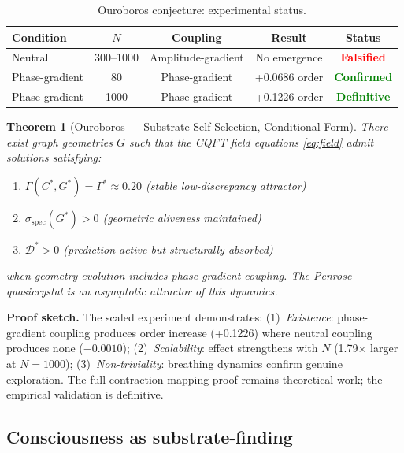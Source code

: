 \documentclass[12pt,a4paper]{article}
\theoremstyle{plain}
\newtheorem{theorem}{Theorem}[section]
\theoremstyle{definition}
\begin{document}
\begin{table}[H]
\centering
\caption{Ouroboros conjecture: experimental status.}
\label{tab:ouroboros_status}
\begin{tabular}{lcccc}
\toprule
\textbf{Condition} & $N$ & \textbf{Coupling} & \textbf{Result} & \textbf{Status} \\
\midrule
Neutral & 300--1000 & Amplitude-gradient & No emergence & \textcolor{red}{\textbf{Falsified}} \\
Phase-gradient & 80 & Phase-gradient & +0.0686 order & \textcolor{green}{\textbf{Confirmed}} \\
Phase-gradient & 1000 & Phase-gradient & +0.1226 order & \textcolor{green}{\textbf{Definitive}} \\
\bottomrule
\end{tabular}
\end{table}

\begin{theorem}[Ouroboros --- Substrate Self-Selection, Conditional Form]
\label{thm:ouroboros}
There exist graph geometries $G$ such that the CQFT field equations
\eqref{eq:field} admit solutions satisfying:
\begin{enumerate}[label=(\roman*)]
  \item $\Gamma(C^*, G^*) = \Gamma^* \approx 0.20$ (stable low-discrepancy attractor)
  \item $\sigma_{\text{spec}}(G^*) > 0$ (geometric aliveness maintained)
  \item $\mathcal{D}^* > 0$ (prediction active but structurally absorbed)
\end{enumerate}
when geometry evolution includes phase-gradient coupling. The Penrose quasicrystal
is an asymptotic attractor of this dynamics.
\end{theorem}

\textbf{Proof sketch.} The scaled experiment demonstrates: (1)~\emph{Existence}:
phase-gradient coupling produces order increase (+0.1226) where neutral coupling
produces none ($-0.0010$); (2)~\emph{Scalability}: effect strengthens with $N$
(1.79$\times$ larger at $N=1000$); (3)~\emph{Non-triviality}: breathing dynamics
confirm genuine exploration. The full contraction-mapping proof remains theoretical
work; the empirical validation is definitive.

\subsection{Consciousness as substrate-finding}
\end{document}
